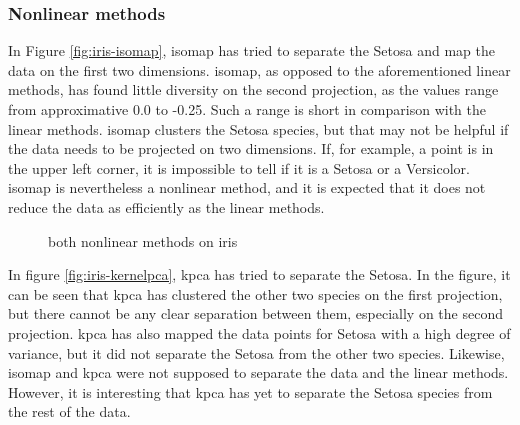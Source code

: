 \subsubsection{Nonlinear methods}\label{subsubsec:nonlinear-methods-on-iris}
In Figure \ref{fig:iris-isomap}, \gls{isomap} has tried to separate the Setosa and map the data on the first two dimensions. \gls{isomap}, as opposed to the aforementioned linear methods, has found little diversity on the second projection, as the values range from approximative 0.0 to -0.25. Such a range is short in comparison with the linear methods. \gls{isomap} clusters the Setosa species, but that may not be helpful if the data needs to be projected on two dimensions. If, for example, a point is in the upper left corner, it is impossible to tell if it is a Setosa or a Versicolor. \gls{isomap} is nevertheless a nonlinear method, and it is expected that it does not reduce the data as efficiently as the linear methods.

\begin{figure}
    \centering
    \qquad
    \caption{both nonlinear methods on iris}
    \label{fig:nonlinear-methods-iris}
\end{figure}

In figure \ref{fig:iris-kernelpca}, \gls{kpca} has tried to separate the Setosa. In the figure, it can be seen that \gls{kpca} has clustered the other two species on the first projection, but there cannot be any clear separation between them, especially on the second projection. \gls{kpca} has also mapped the data points for Setosa with a high degree of variance, but it did not separate the Setosa from the other two species. Likewise, \gls{isomap} and \gls{kpca} were not supposed to separate the data and the linear methods. However, it is interesting that \gls{kpca} has yet to separate the Setosa species from the rest of the data.


